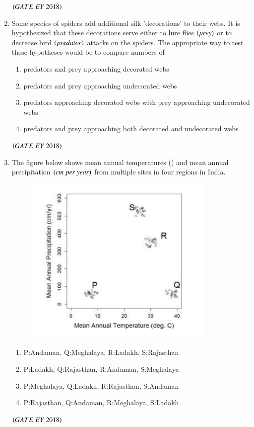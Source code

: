 \documentclass[journal]{IEEEtran}
\numberwithin{equation}{enumi}
\numberwithin{figure}{enumi}
\begin{document}
\begin{enumerate}
    \hfill{$\brak{ GATE\ EY\ 2018}$}
    \bigskip
\item Some species of spiders add additional silk 'decorations' to their webs. It is
hypothesized that these decorations serve either to lure flies $\left(prey\right)$ or to decrease
bird $\left(predator\right)$ attacks on the spiders. The appropriate way to test these hypotheses
would be to compare numbers of
    \begin{enumerate}
        \item predators and prey approaching decorated webs
        \item  predators and prey approaching undecorated webs 
        \item predators approaching decorated webs with prey approaching undecorated webs 
        \item  predators and prey approaching both decorated and undecorated webs
    \end{enumerate}
    \hfill{$\brak{ GATE\ EY\ 2018}$}
    \bigskip
\item The figure below shows mean annual temperatures (\textcelsius) and mean annual
precipitation $\brak{cm\ per\ year}$ from multiple sites in four regions in India.
\begin{figure}[!ht]
    \centering
    \includegraphics[width=0.5\columnwidth]{figs/5.png}
    \caption{}
    \label{fig:5}
   \end{figure}
    \begin{enumerate}
        \item P:Andaman, Q:Meghalaya, R:Ladakh, S:Rajasthan
        \item P:Ladakh, Q:Rajasthan, R:Andaman, S:Meghalaya
        \item P:Meghalaya, Q:Ladakh, R:Rajasthan, S:Andaman
        \item P:Rajasthan, Q:Andaman, R:Meghalaya, S:Ladakh
    \end{enumerate}
    \hfill{$\brak{ GATE\ EY\ 2018}$}
    \bigskip

\end{enumerate}
\end{document}
